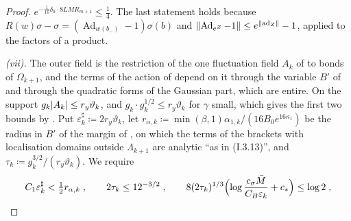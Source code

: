 \documentclass[11pt]{preprint}
\DeclarePairedDelimiter{\abs}{\lvert}{\rvert}
\DeclarePairedDelimiter{\norm}{\lVert}{\rVert}
\numberwithin{equation}{section}
\theoremstyle{definition}
\theoremstyle{remark}
\theoremstyle{plain}
\begin{document}
\begin{proof}
$e^{-\frac{1}{16}\delta_0\cdot 8LMR_{m+1}} \leq \frac14$. The last statement holds because $R(w)\sigma - \sigma = (\operatorname{Ad}_{w(b_-)} - 1)\sigma(b)$ and $\norm{\operatorname{Ad}_{e^Z} - 1} \leq e^{\norm{\operatorname{ad}_Z}} - 1$, applied to the factors of a product.

\emph{(vii).} The outer field is the restriction of the one fluctuation field $A_k$ of \cite[(3.15), p.~267]{BalabanCRE} to bonds of $\Omega_{k+1}$, and the terms of the action of \cite[(3.27)]{BalabanCRE} depend on it through the variable $B'$ of \cite[(1.19), p.~6]{BalabanRG2} and through the quadratic forms of the Gaussian part, which are entire. On the support $g_k\abs{A_k} \leq r_y\vartheta_k$, and $g_k \cdot g_k^{1/2} \leq r_y\vartheta_k$ for $\gamma$ small, which gives the first two bounds by \cite[(1.20), p.~6]{BalabanRG2}. Put $\varepsilon^\sharp_k \coloneqq 2r_y\vartheta_k$, let $r_{\alpha,k} \coloneqq \min(\beta, 1)\alpha_{1,k}/(16B_0e^{16\kappa_1})$ be the radius in $B'$ of the margin of \cite[p.~277]{BalabanCRE}, on which the terms of the brackets with localisation domains outside $\Lambda_{k+1}$ are analytic ``as in (I.3.13)'', and $\tau_k \coloneqq g_k^{3/2}/(r_y\vartheta_k)$. We require
\begin{equation}\label{eq:outer-complex-conditions}
    C_1\varepsilon^\sharp_k < \tfrac12r_{\alpha,k}\;,
    \qquad
    2\tau_k \leq 12^{-3/2}\;,
    \qquad
    8(2\tau_k)^{1/3}\Bigl(\log\frac{c_\sigma\bar M}{C_B\varepsilon_k} + c_*\Bigr) \leq \log 2\;,
\end{equation}

\end{proof}
\end{document}
